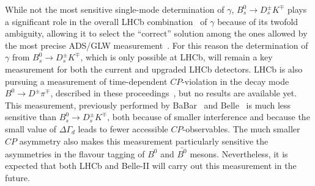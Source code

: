 While not the most sensitive single-mode determination of $\gamma$, $B^0_s \to D^\pm_s K^\mp$ plays a significant
role in the overall LHCb combination~\cite{LHCb-PAPER-2016-032} of $\gamma$ because of its twofold ambiguity, allowing it to select the ``correct''
solution among the ones allowed by the most precise ADS/GLW measurement~\cite{LHCb-PAPER-2016-003}. For this reason the determination
of $\gamma$ from $B^0_s \to D^\pm_s K^\mp$, which is only possible at LHCb, will remain a key measurement for both the current
and upgraded LHCb detectors. LHCb is also pursuing a measurement of time-dependent $CP$-violation in
the decay mode $B^0 \to D^\pm \pi^\mp$, described in these proceedings~\cite{BDPIPROC}, but no results are available yet.
This measurement, previously performed by BaBar~\cite{} and Belle~\cite{}
is much less sensitive than $B^0_s \to D^\pm_s K^\mp$, both because of smaller interference and because
the small value of $\Delta\Gamma_d$ leads to fewer accessible $CP$-observables. The much smaller $CP$ asymmetry
also makes this measurement particularly sensitive the asymmetries in the flavour tagging of $B^0$ and $\bar{B^0}$ mesons.
Nevertheless, it is expected that both LHCb and Belle-II will carry out this measurement in the future.
